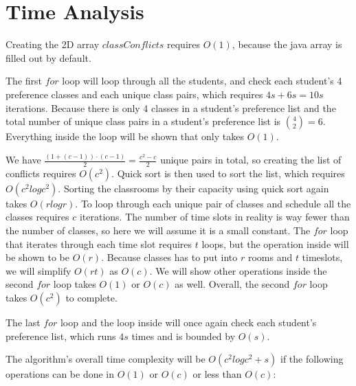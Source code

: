 \documentclass[11pt, oneside]{article}   	%
\begin{document}
\section{Time Analysis}
Creating the 2D array $classConflicts$ requires $O(1)$, because the java array is filled out by default.

The first $for$ loop will loop through all the students, and check each student's 4 preference classes and each unique class pairs, which requires $4s + 6s = 10s$ iterations. Because there is only 4 classes in a student's preference list and the total number of unique class pairs in a student's preference list is ${4 \choose 2} = 6$. Everything inside the loop will be shown that only takes $O(1)$.

We have $\frac{(1+(c-1))\cdot(c-1)}{2} = \frac{c^2-c}{2}$ unique pairs in total, so creating the list of conflicts requires $O(c^2)$. Quick sort is then used to sort the list, which requires $O(c^2 logc^2)$. Sorting the classrooms by their capacity using quick sort again takes $O(rlogr)$. To loop through each unique pair of classes and schedule all the classes requires $c$ iterations. The number of time slots in reality is way fewer than the number of classes, so here we will assume it is a small constant. The $for$ loop that iterates through each time slot requires $t$ loops, but the operation inside will be shown to be $O(r)$. Because classes has to put into $r$ rooms and $t$ timeslots, we will simplify $O(rt)$ as $O(c)$. We will show other operations inside the second $for$ loop takes $O(1)$ or $O(c)$ as well. Overall, the second $for$ loop takes $O(c^2)$ to complete. 

The last $for$ loop and the loop inside will once again check each student's preference list, which runs $4s$ times and is bounded by $O(s)$.

The algorithm's overall time complexity will be $O(c^2logc^2 + s)$ if the following operations can be done in $O(1)$ or $O(c)$ or less than $O(c)$:
\end{document}

